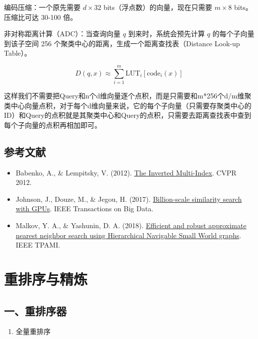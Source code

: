 编码压缩：一个原先需要 \(d\times32\) bits（浮点数）的向量，现在只需要 \(m\times8\) bits。压缩比可达 30-100 倍。

非对称距离计算（ADC）：当查询向量 \(q\) 到来时，系统会预先计算 \(q\) 的每个子向量到该子空间 256 个聚类中心的距离，生成一个距离查找表（Distance Look-up Table）。

\[
D(q,x)\approx \sum_{i=1}^{m}\mathrm{LUT}_i[\mathrm{code}_i(x)]
\]

这样我们不需要把Query和n个d维向量逐个点积，而是只需要和m*256个d/m维聚类中心向量点积，对于每个d维向量来说，它的每个子向量（只需要存聚类中心的ID）和Query的点积就是其聚类中心和Query的点积，只需要去距离查找表中查到每个子向量的点积再相加即可。

\hypertarget{ux53c2ux8003ux6587ux732e-131}{%
\subsection{参考文献}\label{ux53c2ux8003ux6587ux732e-131}}

\begin{itemize}
\tightlist
\item
  Babenko, A., \& Lempitsky, V. (2012). \href{https://ieeexplore.ieee.org/document/6248018}{The Inverted Multi-Index}. CVPR 2012.
\item
  Johnson, J., Douze, M., \& Jegou, H. (2017). \href{https://arxiv.org/abs/1702.08734}{Billion-scale similarity search with GPUs}. IEEE Transactions on Big Data.
\item
  Malkov, Y. A., \& Yashunin, D. A. (2018). \href{https://arxiv.org/abs/1603.09320}{Efficient and robust approximate nearest neighbor search using Hierarchical Navigable Small World graphs}. IEEE TPAMI.
\end{itemize}

\clearpage

\hypertarget{ux91cdux6392ux5e8fux4e0eux7cbeux70bc}{%
\section{重排序与精炼}\label{ux91cdux6392ux5e8fux4e0eux7cbeux70bc}}

\hypertarget{ux4e00ux91cdux6392ux5e8fux5668}{%
\subsection{一、重排序器}\label{ux4e00ux91cdux6392ux5e8fux5668}}

\begin{enumerate}
\def\labelenumi{\arabic{enumi}.}
\tightlist
\item
  全量重排序
\end{enumerate}

